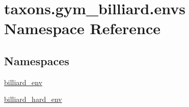 \hypertarget{namespacetaxons_1_1gym__billiard_1_1envs}{}\section{taxons.\+gym\+\_\+billiard.\+envs Namespace Reference}
\label{namespacetaxons_1_1gym__billiard_1_1envs}
\subsection*{Namespaces}
\begin{DoxyCompactItemize}
\item 
 \hyperlink{namespacetaxons_1_1gym__billiard_1_1envs_1_1billiard__env}{billiard\+\_\+env}
\item 
 \hyperlink{namespacetaxons_1_1gym__billiard_1_1envs_1_1billiard__hard__env}{billiard\+\_\+hard\+\_\+env}
\end{DoxyCompactItemize}

